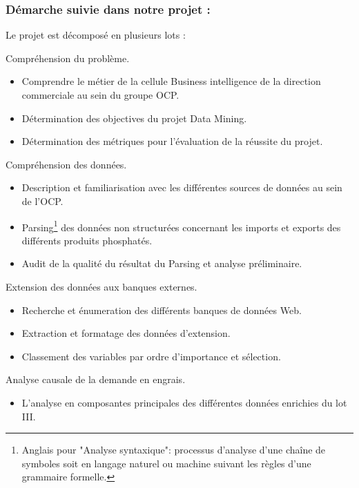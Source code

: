 	\subsubsection{Démarche suivie dans notre projet :}
	Le projet est décomposé en plusieurs lots :
	\begin{description}[align=left]
		\item[Lot I :] Compréhension du problème.
						\begin{itemize}
							\item Comprendre le métier de la cellule Business intelligence de la direction commerciale au sein du groupe OCP.
							\item Détermination des objectives du projet Data Mining.
							\item Détermination des métriques pour l'évaluation de la réussite du projet.
					   	\end{itemize}
		\item[Lot II :] Compréhension des données.
						\begin{itemize}
							\item Description et familiarisation avec les différentes sources de données au sein de l'OCP.
							\item Parsing\footnote{Anglais pour "Analyse syntaxique": processus d'analyse d'une chaîne de symboles soit en langage naturel ou machine suivant les règles d'une grammaire formelle.} des données non structurées concernant les imports et exports des différents produits phosphatés.
							\item Audit de la qualité du résultat du Parsing et analyse préliminaire.
						\end{itemize}		 %
		\item[Lot III :] Extension des données aux banques externes.
						\begin{itemize}
							\item Recherche et énumeration des différents banques de données Web.
							\item Extraction et formatage des données d'extension.
							\item Classement des variables par ordre d'importance et sélection.
						\end{itemize} %
		\item[Lot IV :] Analyse causale de la demande en engrais.
						\begin{itemize}
							\item L'analyse en composantes principales des différentes données enrichies du lot III.

\end{itemize}
\end{description}
